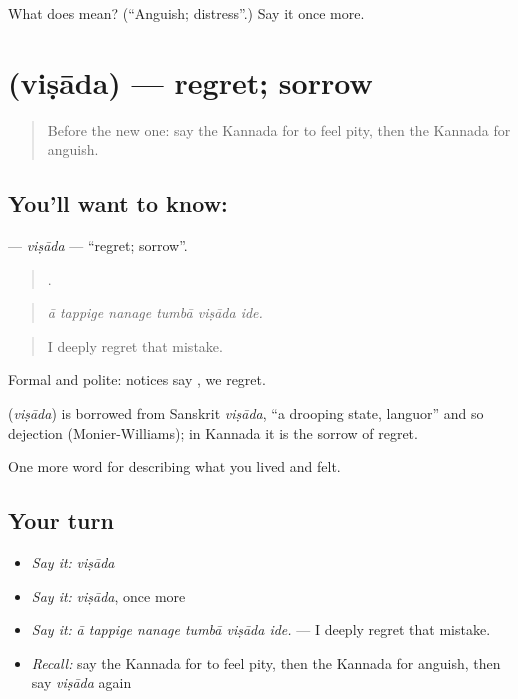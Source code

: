 \begin{tcolorbox}[breakable,colback=teal!4,colframe=teal!35!black,title={Before you move on}]
What does  mean? (\textquotedblleft{}Anguish; distress\textquotedblright{}.) Say it once more.
\end{tcolorbox}
\section[\texorpdfstring{\kn{ವಿಷಾದ} (viṣāda)}{ವಿಷಾದ (viṣāda)}]{ (viṣāda) — regret; sorrow}

\label{lesson:KA-C491-visada}



\begin{quote}
Before the new one: say the Kannada for to feel pity, then the Kannada for anguish.
\end{quote}

\subsection*{You'll want to know: }
\textbf{} — \emph{viṣāda} — \textquotedblleft{}regret; sorrow\textquotedblright{}.

\begin{quote}
     .
\end{quote}

\begin{quote}
\emph{ā tappige nanage tumbā viṣāda ide.}
\end{quote}

\begin{quote}
I deeply regret that mistake.
\end{quote}

Formal and polite: notices say , we regret.

\begin{cousinweb}
\textbf{} (\emph{viṣāda}) is borrowed from Sanskrit \emph{viṣāda}, \textquotedblleft{}a drooping state, languor\textquotedblright{} and so dejection (Monier-Williams); in Kannada it is the sorrow of regret.
\end{cousinweb}

\begin{grammarlens}[title={What you've built}]
One more word for describing what you lived and felt.
\end{grammarlens}

\subsection*{Your turn}
\begin{itemize}
\raggedright
  \item \emph{Say it:} \emph{viṣāda}
  \item \emph{Say it:} \emph{viṣāda}, once more
  \item \emph{Say it:} \emph{ā tappige nanage tumbā viṣāda ide.} — I deeply regret that mistake.
  \item \emph{Recall:} say the Kannada for to feel pity, then the Kannada for anguish, then say \emph{viṣāda} again
\end{itemize}

